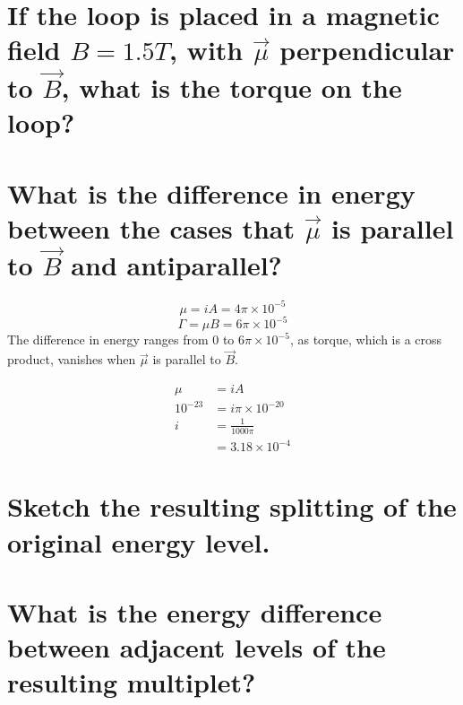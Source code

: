 \documentclass[answers]{exam}
\begin{document}
\begin{questions}
\begin{parts}
\part{If the loop is placed in a magnetic field $B=1.5\unit{T}$, with $\vec{\mu}$ perpendicular to $\vec{B}$, what is the torque on the loop?}
\part{What is the difference in energy between the cases that $\vec{\mu}$ is parallel to $\vec{B}$ and antiparallel?}
\end{parts}

\begin{solution}
	$$\mu = iA = 4\pi\times10^{-5}$$
	$$\Gamma = \mu B = 6\pi\times10^{-5}$$
	The difference in energy ranges from $0$ to $6\pi\times10^{-5}$, as torque, which is a cross product, vanishes when $\vec{\mu}$ is parallel to $\vec{B}$.
\end{solution}


\begin{solution}
	\begin{align*}
		\mu &= iA \\
		10^{-23} &= i\pi\times10^{-20} \\
		i &= \frac{1}{1000\pi} \\
		  &= 3.18 \times 10^{-4}
	\end{align*}
\end{solution}


\begin{parts}
\part{Sketch the resulting splitting of the original energy level.}
\part{What is the energy difference between adjacent levels of the resulting multiplet?}
\end{parts}


\end{questions}
\end{document}
